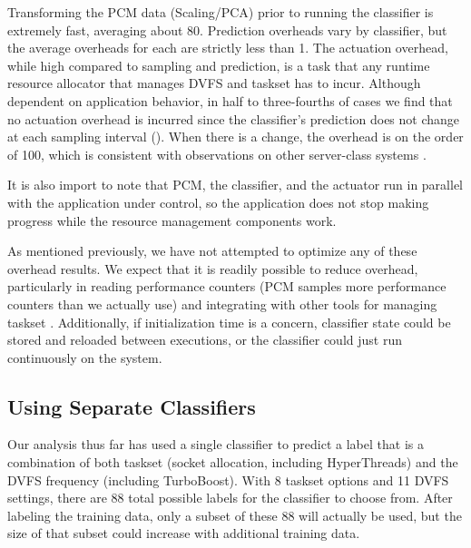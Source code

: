 Transforming the PCM data (Scaling/PCA) prior to running the classifier is extremely fast, averaging about 80\us.
Prediction overheads vary by classifier, but the average overheads for each are strictly less than 1\ms.
The actuation overhead, while high compared to sampling and prediction, is a task that any runtime resource allocator that manages DVFS and taskset has to incur.
Although dependent on application behavior, in half to three-fourths of cases we find that no actuation overhead is incurred since the classifier's prediction does not change at each sampling interval ().
When there is a change, the overhead is on the order of 100\ms, which is consistent with observations on other server-class systems \cite{POETMCSoC}.

It is also import to note that PCM, the classifier, and the actuator run in parallel with the application under control, so the application does not stop making progress while the resource management components work.

As mentioned previously, we have not attempted to optimize any of these overhead results.
We expect that it is readily possible to reduce overhead, particularly in reading performance counters (PCM samples more performance counters than we actually use) and integrating with other tools for managing taskset \cite{Sridharan2013}.
Additionally, if initialization time is a concern, classifier state could be stored and reloaded between executions, or the classifier could just run continuously on the system.


\subsection{Using Separate Classifiers}
\label{sec:eval-separate-classifiers}

Our analysis thus far has used a single classifier to predict a label that is a combination of both taskset (socket allocation, including HyperThreads) and the DVFS frequency (including TurboBoost).
With 8 taskset options and 11 DVFS settings, there are 88 total possible labels for the classifier to choose from.
After labeling the training data, only a subset of these 88 will actually be used, but the size of that subset could increase with additional training data.

